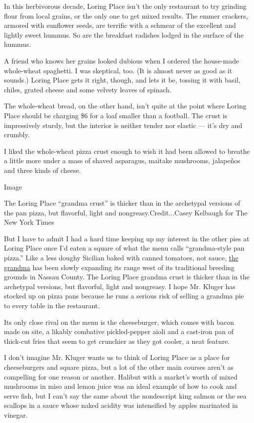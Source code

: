 In this herbivorous decade, Loring Place isn't the only restaurant to
try grinding flour from local grains, or the only one to get mixed
results. The emmer crackers, armored with sunflower seeds, are terrific
with a schmear of the excellent and lightly sweet hummus. So are the
breakfast radishes lodged in the surface of the hummus.

A friend who knows her grains looked dubious when I ordered the
house-made whole-wheat spaghetti. I was skeptical, too. (It is almost
never as good as it sounds.) Loring Place gets it right, though, and
lets it be, tossing it with basil, chiles, grated cheese and some
velvety leaves of spinach.

The whole-wheat bread, on the other hand, isn't quite at the point where
Loring Place should be charging \$6 for a loaf smaller than a football.
The crust is impressively sturdy, but the interior is neither tender nor
elastic --- it's dry and crumbly.

I liked the whole-wheat pizza crust enough to wish it had been allowed
to breathe a little more under a mass of shaved asparagus, maitake
mushrooms, jalapeños and three kinds of cheese.

Image

The Loring Place ``grandma crust'' is thicker than in the archetypal
versions of the pan pizza, but flavorful, light and
nongreasy.Credit...Casey Kelbaugh for The New York Times

But I have to admit I had a hard time keeping up my interest in the
other pies at Loring Place once I'd eaten a square of what the menu
calls ``grandma-style pan pizza.'' Like a less doughy Sicilian baked
with canned tomatoes, not sauce,
\href{http://www.bonappetit.com/restaurants-travel/article/find-grandma-pie}{the
grandma} has been slowly expanding its range west of its traditional
breeding grounds in Nassau County. The Loring Place grandma crust is
thicker than in the archetypal versions, but flavorful, light and
nongreasy. I hope Mr. Kluger has stocked up on pizza pans because he
runs a serious risk of selling a grandma pie to every table in the
restaurant.

Its only close rival on the menu is the cheeseburger, which comes with
bacon made on site, a likably combative pickled-pepper aioli and a
cast-iron pan of thick-cut fries that seem to get crunchier as they got
cooler, a neat feature.

I don't imagine Mr. Kluger wants us to think of Loring Place as a place
for cheeseburgers and square pizza, but a lot of the other main courses
aren't as compelling for one reason or another. Halibut with a market's
worth of mixed mushrooms in miso and lemon juice was an ideal example of
how to cook and serve fish, but I can't say the same about the
nondescript king salmon or the sea scallops in a sauce whose naked
acidity was intensified by apples marinated in vinegar.

